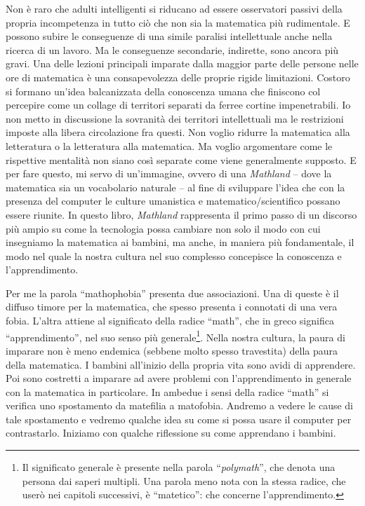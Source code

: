 Non è raro che adulti intelligenti si riducano ad essere osservatori passivi della propria incompetenza in tutto ciò che non sia la matematica più rudimentale. E possono subire le conseguenze di una simile paralisi intellettuale anche nella ricerca di un lavoro. Ma le conseguenze secondarie, indirette, sono ancora più gravi. Una delle lezioni principali imparate dalla maggior parte delle persone nelle ore di matematica è una consapevolezza delle proprie rigide limitazioni. Costoro si formano un'idea balcanizzata della conoscenza umana che finiscono col percepire come un collage di territori separati da ferree cortine impenetrabili. Io non metto in discussione la sovranità dei territori intellettuali ma le restrizioni imposte alla libera circolazione fra questi. Non voglio ridurre la matematica alla letteratura o la letteratura alla matematica. Ma voglio argomentare come le rispettive mentalità non siano così separate come viene generalmente supposto. E per fare questo, mi servo di un'immagine, ovvero di una \textit{Mathland}  – dove la matematica sia un vocabolario naturale – al fine di sviluppare l'idea che con la presenza del computer le culture umanistica e matematico/scientifico possano essere riunite. In questo libro, \textit{Mathland} rappresenta il primo passo di un discorso più ampio su come la tecnologia possa cambiare non solo il modo con cui insegniamo la matematica ai bambini, ma anche, in maniera più fondamentale, il modo nel quale la nostra cultura nel suo complesso concepisce la conoscenza e l'apprendimento.

Per me la parola “mathophobia” presenta due associazioni. Una di queste è il diffuso timore per la matematica, che spesso presenta i connotati di una vera fobia. L'altra attiene al significato della radice “math”, che in greco significa “apprendimento”, nel suo senso più generale\footnote{Il significato generale è presente nella parola “\textit{polymath}”, che denota una persona dai saperi multipli. Una parola meno nota con la stessa radice, che userò nei capitoli successivi, è “matetico”: che concerne l'apprendimento.}.  Nella nostra cultura, la paura di imparare non è meno endemica (sebbene molto spesso travestita) della paura della matematica. I bambini all'inizio della propria vita sono avidi di apprendere. Poi sono costretti a imparare ad avere problemi con l'apprendimento in generale con la matematica in particolare. In ambedue i sensi della radice “math” si verifica uno spostamento da matefilia a matofobia. Andremo a vedere le cause di tale spostamento e vedremo qualche idea su come si possa usare il computer per contrastarlo. Iniziamo con qualche riflessione su come apprendano i bambini.

